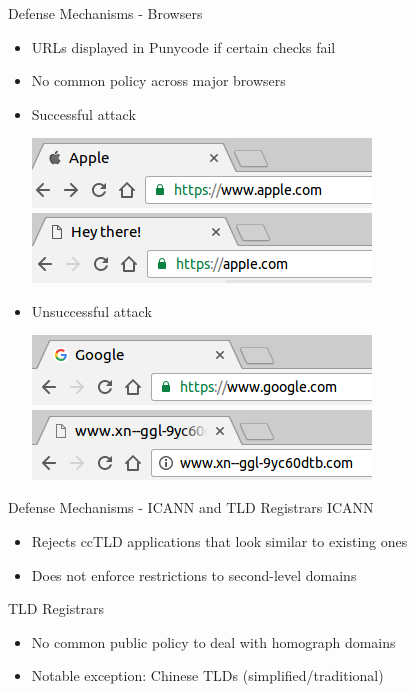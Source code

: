 \documentclass[usepdftitle=false]{beamer}
\begin{document}
\begin{frame}{Defense Mechanisms - Browsers}
\begin{itemize}
\item URLs displayed in Punycode if certain checks fail
\item No common policy across major browsers
\item Successful attack

\includegraphics[width=0.4\linewidth]{images/apple}
\includegraphics[width=0.4\linewidth]{images/fakeapple-punycode}

\item Unsuccessful attack

\includegraphics[width=0.4\linewidth]{images/google}
\includegraphics[width=0.4\linewidth]{images/fakegoogle-punycode}
\end{itemize}

\end{frame}

\begin{frame}{Defense Mechanisms - ICANN and TLD Registrars}
ICANN
\begin{itemize}
  \item Rejects ccTLD applications that look similar to existing ones
  \item Does not enforce restrictions to second-level domains
\end{itemize}
TLD Registrars
\begin{itemize}
  \item No common public policy to deal with homograph domains
  \item Notable exception: Chinese TLDs (simplified/traditional)
\end{itemize}
\end{frame}
\end{document}
